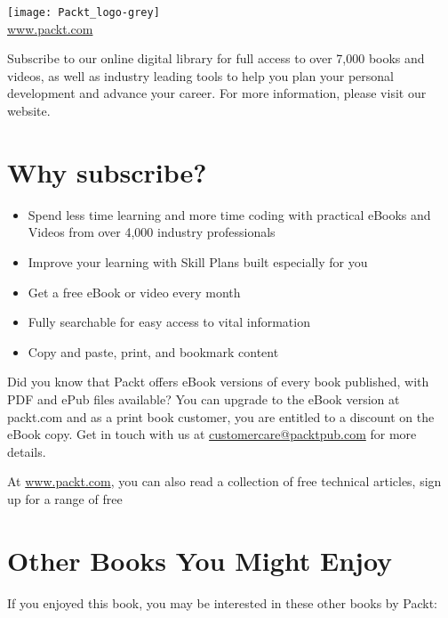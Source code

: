 \pagestyle{empty}
\nopagecolor
\begin{flushleft}
\texttt{[image: Packt\_logo-grey]}\\
\url{www.packt.com}

\vspace{0.2 cm}

Subscribe to our online digital library for full access to over 7,000 books and videos, as well as industry leading tools to help you plan your personal development and advance your career. For more information, please visit our website.

\section*{Why subscribe?}
\begin{itemize}[nosep]
    \item Spend less time learning and more time coding with practical eBooks and Videos from over 4,000 industry professionals
    \item Improve your learning with Skill Plans built especially for you
    \item Get a free eBook or video every month
    \item Fully searchable for easy access to vital information
    \item Copy and paste, print, and bookmark content
\end{itemize}

\vspace{0.2 cm}

Did you know that Packt offers eBook versions of every book published, with PDF and ePub files available? You can upgrade to the eBook version at packt.com and as a print book customer, you are entitled to a discount on the eBook copy. Get in touch with us at \href{mailto:customercare@packtpub.com}{customercare@packtpub.com} for more details.

\vspace{0.2 cm}

At \url{www.packt.com}, you can also read a collection of free technical articles, sign up for a range of free
\newpage
\section*{Other Books You Might Enjoy}
If you enjoyed this book, you may be interested in these other books by Packt:\\

\vspace{0.2 cm}


\end{flushleft}
